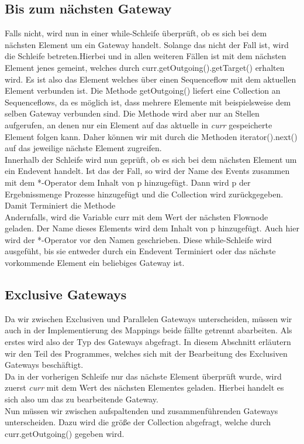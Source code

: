 \subsection{Bis zum nächsten Gateway}
Falls nicht, wird nun in einer while-Schleife überprüft, ob es sich bei dem nächsten Element um ein Gateway handelt. Solange das nicht der Fall ist, wird die Schleife betreten.Hierbei und in allen weiteren Fällen ist mit dem nächsten Element jenes gemeint, welches durch curr.getOutgoing().getTarget() erhalten wird. Es ist also das Element welches über einen Sequenceflow mit dem aktuellen Element verbunden ist. Die Methode getOutgoing() liefert eine Collection an Sequenceflows, da es möglich ist, dass mehrere Elemente mit beispielsweise dem selben Gateway verbunden sind. Die Methode wird aber nur an Stellen aufgerufen, an denen nur ein Element auf das aktuelle in \textit{curr} gespeicherte Element folgen kann. Daher können wir mit durch die Methoden iterator().next() auf das jeweilige nächste Element zugreifen.\\
Innerhalb der Schleife wird nun geprüft, ob es sich bei dem nächsten Element um ein Endevent handelt. Ist das der Fall, so wird der Name des Events zusammen mit dem *-Operator dem Inhalt von p hinzugefügt. Dann wird p der Ergebnissmenge Prozesse hinzugefügt und die Collection wird zurückgegeben. Damit Terminiert die Methode\\
Andernfalls, wird die Variable curr mit dem Wert der nächsten Flownode geladen. Der Name dieses Elements wird dem Inhalt von p hinzugefügt. Auch hier wird der *-Operator vor den Namen geschrieben. Diese while-Schleife wird ausgefüht, bis sie entweder durch ein Endevent Terminiert oder das nächste vorkommende Element ein beliebiges Gateway ist.
\subsection{Exclusive Gateways}
Da wir zwischen Exclusiven und Parallelen Gateways unterscheiden, müssen wir auch in der Implementierung des Mappings beide fällte getrennt abarbeiten. Als erstes wird also der Typ des Gateways abgefragt. In diesem Abschnitt erläutern wir den Teil des Programmes, welches sich mit der Bearbeitung des Exclusiven Gateways beschäftigt.\\
Da in der vorherigen Schleife nur das nächste Element überprüft wurde, wird zuerst \textit{curr} mit dem Wert des nächsten Elementes geladen. Hierbei handelt es sich also um das zu bearbeitende Gateway.\\
Nun müssen wir zwischen aufspaltenden und zusammenführenden Gateways unterscheiden. Dazu wird die größe der Collection abgefragt, welche durch curr.getOutgoing() gegeben wird.
